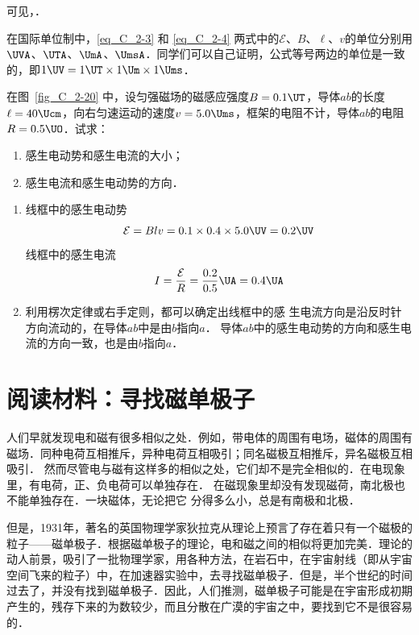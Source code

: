 可见，．

在国际单位制中，\eqref{eq_C_2-3} 和 \eqref{eq_C_2-4} 两式中的$\mathcal{E}$、$B$、$\ell$、$v$的单位分别用$\UVA$、$\UTA$、$\UmA$、$\UmsA$．同学们可以自己证明，公式等号两边的单位是一致的，即$1 \UV=1\UT \times1\Um\times1\Ums$．

\begin{example}
    在图~\ref{fig_C_2-20} 中，设匀强磁场的磁感应强度$B=0.1\UT$，导体$ab$的长度$\ell=40\Ucm$，向右匀速运动的速度$v=5.0\Ums$，框架的电阻不计，导体$ab$的电阻$R=0.5\UO$．试求：
    \begin{enumerate}
        \item 感生电动势和感生电流的大小；
        \item 感生电流和感生电动势的方向．
    \end{enumerate}
\end{example}

\begin{solution}
\begin{enumerate}
    \item 线框中的感生电动势
\[\mathcal{E}=Blv=0.1\times0.4\times5.0 \UV =0.2 \UV \]    
线框中的感生电流
\[I=\frac{\mathcal{E}}{R}=\frac{0.2}{0.5} \UA =0.4\UA \]

\item 利用楞次定律或右手定则，都可以确定出线框中的感
生电流方向是沿反时针方向流动的，在导体$ab$中是由$b$指向$a$． 导体$ab$中的感生电动势的方向和感生电流的方向一致，也是由$b$指向$a$．
\end{enumerate}
\end{solution}
   
\section*{阅读材料：寻找磁单极子}
人们早就发现电和磁有很多相似之处．例如，带电体的周围有电场，磁体的周围有磁场．同种电荷互相推斥，异种电荷互相吸引；同名磁极互相推斥，异名磁极互相吸引．
然而尽管电与磁有这样多的相似之处，它们却不是完全相似的．在电现象里，有电荷，正、负电荷可以单独存在．
在磁现象里却没有发现磁荷，南北极也不能单独存在．一块磁体，无论把它
分得多么小，总是有南极和北极．

但是，1931年，著名的英国物理学家狄拉克从理论上预言了存在着只有一个磁极的粒子——磁单极子．根据磁单极子的理论，电和磁之间的相似将更加完美．理论的动人前景，吸引了一批物理学家，用各种方法，在岩石中，在宇宙射线（即从宇宙空间飞来的粒子）中，在加速器实验中，去寻找磁单极子．但是，半个世纪的时间过去了，并没有找到磁单极子．因此，人们推测，磁单极子可能是在宇宙形成初期产生的，残存下来的为数较少，而且分散在广漠的宇宙之中，要找到它不是很容易的．


